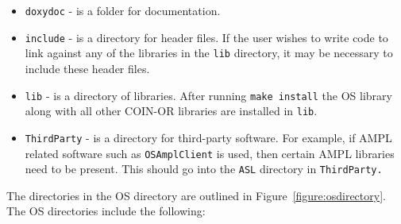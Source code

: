 \documentclass[11pt]{article}
\newcounter{Fig}
\renewcommand{\_}{{\char"5F}}
\renewcommand{\{}{{\char"7B}}
\renewcommand{\}}{{\char"7D}}
\renewcommand{\^}{{\char"0D}}
\renewcommand{\'}{{\char"0D}}
\begin{document}
\begin{enumerate}[Step 1:]
\begin{itemize}
\item {\tt doxydoc} - is a folder for documentation.

\item {\tt include} - is a directory for header files. If the user wishes to write code to link against any of the libraries in the {\tt lib} directory, it may be necessary to include these header files.

\item {\tt lib} - is a directory of libraries. After running {\tt make install} the OS library along with all other COIN-OR libraries are installed in {\tt lib}.

\item {\tt ThirdParty} - is a  directory for third-party software. For example, if AMPL related software
such as {\tt OSAmplClient} is used, then certain AMPL libraries need to be present.
This should go into the {\tt ASL} directory in {\tt ThirdParty.}
\end{itemize}


The directories in the OS directory are outlined in Figure~\ref{figure:osdirectory}.  The OS directories include the following:



\end{enumerate}
\end{document}
